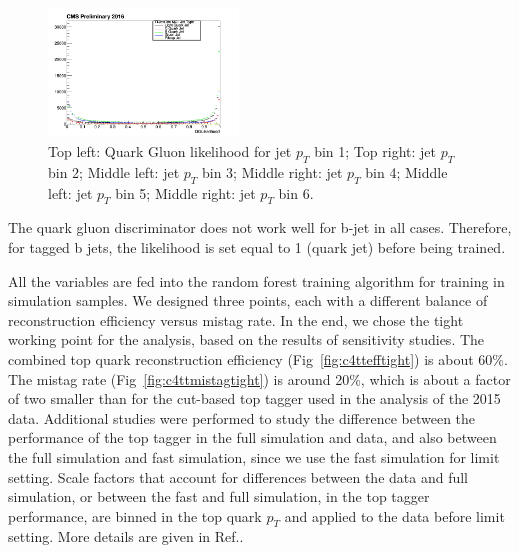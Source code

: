 \begin{figure}[htbp]
\begin{center}
  \includegraphics[width=0.45\textwidth]{sections/mc4/TopTagger/figures/_b_qglikelihoodjetptbin5_.png}
 \end{center}
 \caption{Top left: Quark Gluon likelihood for jet $p_{T}$ bin 1; Top right: jet $p_{T}$ bin 2; Middle left: jet $p_{T}$ bin 3; Middle right: jet $p_{T}$ bin 4; Middle left: jet $p_{T}$ bin 5; Middle right: jet $p_{T}$ bin 6.}
 \label{fig:c4ttqgljetpt}
\end{figure}

The quark gluon discriminator does not work well for b-jet in all cases. Therefore, for tagged b jets, the likelihood is set equal to 1 (quark jet) before being trained.

All the variables are fed into the random forest\cite{Ho:1995:RDF:844379.844681} training algorithm for training in simulation samples. We designed three points, each with a different balance of reconstruction efficiency versus mistag rate. In the end, we chose the tight working point for the analysis, based on the results of sensitivity studies. The combined top quark reconstruction efficiency (Fig~\ref{fig:c4ttefftight}) is about 60\%. The mistag rate (Fig~\ref{fig:c4ttmistagtight}) is around 20\%, which is about a factor of two smaller than for the cut-based top tagger used in the analysis of the 2015 data. Additional studies were performed to study the difference between the performance of the top tagger in the full simulation and data, and also between the full simulation and fast simulation, since we use the fast simulation for limit setting. Scale factors that account for differences between the data and full simulation, or between the fast and full simulation, in the top tagger performance, are binned in the top quark $p_{T}$ and applied to the data before limit setting. More details are given in Ref.\cite{AN-16-461}. 

